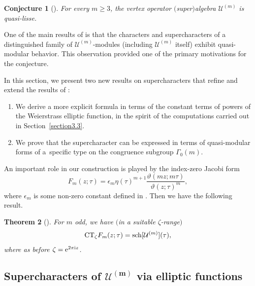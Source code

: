 \documentclass[10pt,a4paper]{amsart}
\numberwithin{equation}{section}
\newtheorem{Theorem}{Theorem}[section]
\newtheorem{Conjecture}[Theorem]{Conjecture}
\theoremstyle{definition}
\begin{document}
\begin{Conjecture}[\cite{AM}] For every $m \geq 3$, the vertex operator $($super$)$algebra $\mathcal{U}^{(m)}$ is quasi-lisse.
\end{Conjecture}

One of the main results of \cite{AM} is that the characters and supercharacters of a distinguished family of $\mathcal{U}^{(m)}$-modules (including $\mathcal{U}^{(m)}$ itself) exhibit quasi-modular behavior.
This observation provided one of the primary motivations for the conjecture.

In this section, we present two new results on supercharacters that refine and extend the results of \cite{AM}:
\begin{enumerate}\itemsep=0pt
\item We derive a more explicit formula in terms of the constant terms of powers of the Weierstrass elliptic function, in the spirit of the computations carried out in Section~\ref{section3.3}.

\item We prove that the supercharacter can be expressed in terms of quasi-modular forms of a~specific type on the congruence subgroup $\Gamma_0(m)$.
\end{enumerate}
An important role in our construction is played by the index-zero Jacobi form
\begin{equation*} %
F_m(z;\tau)=\epsilon_m \eta(\tau)^{m+1} \frac{\vartheta(mz;m\tau)}{\vartheta(z;\tau)^m},
\end{equation*}
where $\epsilon_m$ is some non-zero constant defined in \cite{AM}. Then we have the following result.

\begin{Theorem}[\cite{AM}] For $m$ odd, we have $($in a suitable $\zeta$-range$)$
\[
{\rm CT}_{\zeta} F_m(z;\tau)={\rm sch}[\mathcal{U}^{(m)}](\tau),
\]
where as before $\zeta={\rm e}^{2 \pi {\rm i} z}$.
\end{Theorem}

\subsection[Supercharacters of U\^{}\{(m)\} via elliptic functions]{Supercharacters of $\boldsymbol{\mathcal{U}^{(m)}}$ via elliptic functions}\label{section4.1}
\end{document}
